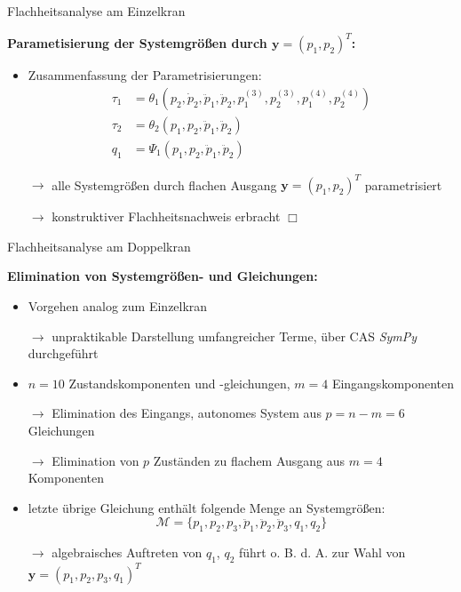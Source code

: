 \documentclass[
	ngerman,
	10pt,				%
	aspectratio=169 	%
]{beamer}
\begin{document}

\begin{frame}[t,fragile,label=Flachheit_Einzelkran_6]{\large Flachheitsanalyse am Einzelkran}
	
	\textbf{Parametisierung der Systemgrößen durch $\mathbf{y} = (p_1, p_2)^T$:}
	
	\begin{itemize}
		\item Zusammenfassung der Parametrisierungen:
		\begin{align*}
			\tau_1 &= \theta_1\left(p_2, \dot{p}_2, \ddot{p}_1, \ddot{p}_2, p_1^{(3)}, p_2^{(3)}, p_1^{(4)}, p_2^{(4)} \right) \\
			\tau_2 &= \theta_2(p_1, p_2, \ddot{p}_1, \ddot{p}_2) \\
			q_1 &= \Psi_1(p_1, p_2, \ddot{p}_1, \ddot{p}_2)
		\end{align*}
		\pause
		\item[$\rightarrow$] alle Systemgrößen durch flachen Ausgang $\mathbf{y} = (p_1, p_2)^T$ parametrisiert
		\pause
		\bigskip
		\item[$\rightarrow$] konstruktiver Flachheitsnachweis erbracht \quad $\Box$
	\end{itemize}
	
\end{frame}


\begin{frame}[t,fragile,label=Flachheit_Doppelkran_1]{\large Flachheitsanalyse am Doppelkran}
	
	\textbf{Elimination von Systemgrößen- und Gleichungen:}
	
	\begin{itemize}
		\item Vorgehen analog zum Einzelkran
		\pause
		\item[$\rightarrow$] unpraktikable Darstellung umfangreicher Terme, über CAS \textit{SymPy} durchgeführt
		\pause
		\bigskip
		\item $n = 10$ Zustandskomponenten und -gleichungen, $m = 4$ Eingangskomponenten
		\pause
		\item[$\rightarrow$] Elimination des Eingangs, autonomes System aus $p = n - m = 6$ Gleichungen
		\pause
		\item[$\rightarrow$] Elimination von $p$ Zuständen zu flachem Ausgang aus $m = 4$ Komponenten
		\pause
		\bigskip
		\item letzte übrige Gleichung enthält folgende Menge an Systemgrößen:
		\begin{equation*}
			\mathcal{M} = \{p_1, p_2, p_3, \ddot{p}_1, \ddot{p}_2, \ddot{p}_3, q_1, q_2 \}
		\end{equation*}
		\pause
		\item[$\rightarrow$] algebraisches Auftreten von $q_1$, $q_2$ führt o. B. d. A. zur Wahl von $\mathbf{y} = (p_1, p_2, p_3, q_1)^T$
	\end{itemize}
	
\end{frame}
\end{document}
